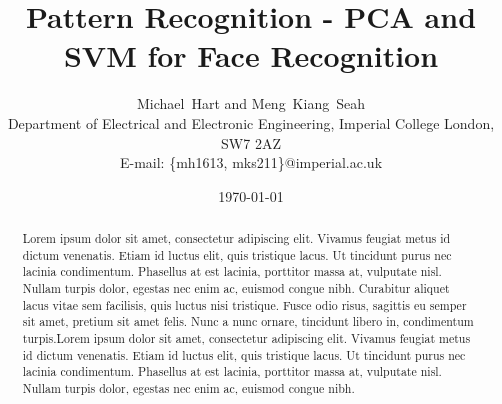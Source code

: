 \documentclass[a4paper, 10pt, conference]{ieeeconf}
\begin{document}
\title{Pattern Recognition - PCA and SVM for Face Recognition}
\author{Michael~Hart and
        Meng~Kiang~Seah
\\
        Department of Electrical and Electronic Engineering,
        Imperial College London,
        SW7 2AZ
 \\
        E-mail: \{mh1613, mks211\}@imperial.ac.uk}
\date{\today}




\maketitle


\begin{abstract}
 Lorem ipsum dolor sit amet, consectetur adipiscing elit. Vivamus feugiat metus id dictum venenatis. Etiam id luctus elit, quis tristique lacus. Ut tincidunt purus nec lacinia condimentum. Phasellus at est lacinia, porttitor massa at, vulputate nisl. Nullam turpis dolor, egestas nec enim ac, euismod congue nibh. Curabitur aliquet lacus vitae sem facilisis, quis luctus nisi tristique. Fusce odio risus, sagittis eu semper sit amet, pretium sit amet felis. Nunc a nunc ornare, tincidunt libero in, condimentum turpis.Lorem ipsum dolor sit amet, consectetur adipiscing elit. Vivamus feugiat metus id dictum venenatis. Etiam id luctus elit, quis tristique lacus. Ut tincidunt purus nec lacinia condimentum. Phasellus at est lacinia, porttitor massa at, vulputate nisl. Nullam turpis dolor, egestas nec enim ac, euismod congue nibh.
\end{abstract}

\end{document}
